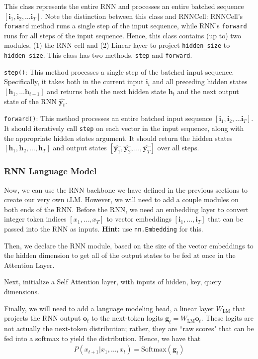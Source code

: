 \documentclass[11pt,addpoints,answers]{exam}
\newcommand{\gv}{\mathbf{g}}
\newcommand{\hv}{\mathbf{h}}
\newcommand{\iv}{\mathbf{i}}
\newcommand{\ov}{\mathbf{o}}
\newcommand{\yv}{\mathbf{y}}
\begin{document}
This class represents the entire RNN and processes an entire batched sequence $[\iv_1, \iv_2, \ldots \iv_T]$. Note the distinction between this class and RNNCell: RNNCell's \texttt{forward} method runs a single step of the input sequence, while RNN's \texttt{forward} runs for all steps of the input sequence. Hence, this class contains (up to) two modules, (1) the RNN cell and (2) Linear layer to project \texttt{hidden\_size} to \texttt{hidden\_size}. This class has two methods, \texttt{step} and \texttt{forward}.

\texttt{step()}: This method processes a single step of the batched input sequence. Specifically, it takes both in the current input $\iv_t$ and all preceding hidden states $[\hv_1, \ldots \hv_{t-1}]$ and returns both the next hidden state $\hv_t$ and the next output state of the RNN $\hat{\yv_t}$. 

\texttt{forward()}: This method processes an entire batched input sequence $[\iv_1, \iv_2, \ldots \iv_T]$. It should iteratively call \texttt{step} on each vector in the input sequence, along with the appropriate hidden states argument. It should return the hidden states $[\hv_1, \hv_2, \ldots, \hv_T]$ and output states $[\hat{\yv_1}, \hat{\yv_2}, \ldots, \hat{\yv_T}]$ over all steps.


\subsubsection{RNN Language Model}

Now, we can use the RNN backbone we have defined in the previous sections to create our very own \textsc{l}LM. However, we will need to add a couple modules on both ends of the RNN. Before the RNN, we need an embedding layer to convert integer token indices $[x_1, \ldots, x_T]$ to vector embeddings $[\iv_1, \ldots, \iv_T]$ that can be passed into the RNN as inputs. 
\textbf{Hint:} use \texttt{nn.Embedding} for this. 

Then, we declare the RNN module, based on the size of the vector embeddings to the hidden dimension to get all of the output states to be fed at once in the Attention Layer.

Next, initialize a Self Attention layer, with inputs of hidden, key, query dimensions. 

Finally, we will need to add a language modeling head, a linear layer $W_\text{LM}$ that projects the RNN output $\ov_t$ to the next-token logits $\gv_t = W_\text{LM} \ov_t$. These logits are not actually the next-token distribution; rather, they are ``raw scores" that can be fed into a softmax to yield the distribution. Hence, we have that
\begin{align*}
    P(x_{t+1} | x_1, \ldots, x_t) = \text{Softmax}(\gv_t)
\end{align*}
\end{document}
